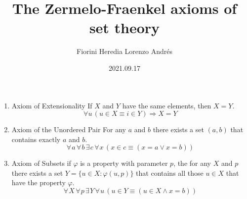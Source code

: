 \documentclass[12pt]{article}
\author{Fiorini Heredia Lorenzo Andrés}
\title{The Zermelo-Fraenkel axioms of set theory}
\date{2021.09.17}
\begin{document}
\maketitle
{}

\begin{enumerate}

\item {\color{blue}Axiom of Extensionality} If $X$ and $Y$ have the same elements, then $X = Y$.
\begin{equation}
	\forall u   \hspace{2pt}  
	(u \in X \equiv i \in Y)  
	\Rightarrow X = Y
\end{equation}

\item {\color{blue}Axiom of the Unordered Pair} For any $a$ and $b$ there exists a set $(a, b)$ that contains exactly $a$ and $b$.
\begin{equation}
	\forall \hspace{1pt} a \hspace{2pt}  
	\forall \hspace{1pt} b  \hspace{2pt}  
	\exists \hspace{1pt} c  \hspace{2pt}  
	\forall \hspace{1pt} x   \hspace{2pt}  
	(x \in c \equiv (x = a \lor x = b))
\end{equation}

\item {\color{blue}Axiom of Subsets}  if $\varphi$ is a property with parameter $p$, the for any $X$ and $p$ there exists a set $Y = \{u \in X: \varphi(u, p)\}$ that contains all those $u \in X$ that have the property $\varphi$.
\begin{equation}
	\forall \hspace{1pt} X  \hspace{2pt}  
	\forall \hspace{1pt} p  \hspace{2pt}  
	\exists \hspace{1pt} Y  \hspace{2pt}  
	\forall \hspace{1pt} u   \hspace{2pt}  
	(u \in Y \equiv (u \in X \land x = b))	
\end{equation}


\end{enumerate}
\end{document}
